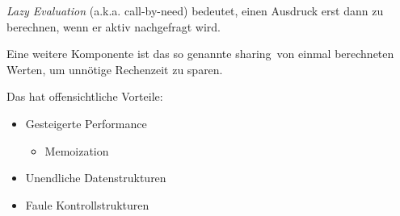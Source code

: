 \documentclass[unknownkeysallowed]{beamer}
\begin{document}

\begin{frame}

\emph{Lazy Evaluation} (a.k.a. call-by-need) bedeutet, einen Ausdruck erst dann zu berechnen, wenn er aktiv nachgefragt wird.\bigskip \pause

Eine weitere Komponente ist das so genannte \glqq sharing\grqq\ von einmal berechneten Werten, um unnötige Rechenzeit zu sparen.\bigskip \pause

Das hat offensichtliche Vorteile: \pause \smallskip
\begin{itemize}
\item Gesteigerte Performance \pause
	\begin{itemize}
	\item Memoization
	\end{itemize} \pause
\item Unendliche Datenstrukturen \pause
\item Faule Kontrollstrukturen 
\end{itemize}
\end{frame}

\end{document}
